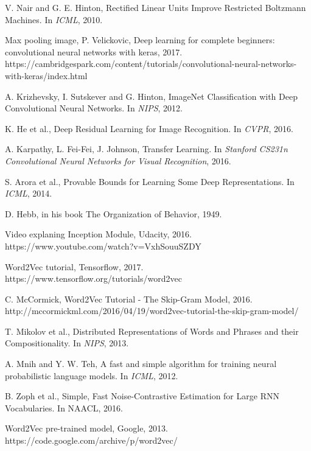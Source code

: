 \begin{thebibliography}{999}
V. Nair and G. E. Hinton, Rectified Linear Units Improve Restricted Boltzmann Machines. In \textit{ICML}, 2010.

Max pooling image, P. Velickovic, 
Deep learning for complete beginners: convolutional neural networks with keras, 2017.\\
https://cambridgespark.com/content/tutorials/convolutional-neural-networks-with-keras/index.html

A. Krizhevsky, I. Sutskever and G. Hinton, ImageNet Classification with Deep Convolutional
Neural Networks. In \textit{NIPS}, 2012.

K. He et al., Deep Residual Learning for Image Recognition. In \textit{CVPR}, 2016.

A. Karpathy, L. Fei-Fei, J. Johnson, Transfer Learning. In \textit{Stanford CS231n Convolutional Neural Networks for Visual Recognition}, 2016.

S. Arora et al., Provable Bounds for Learning Some Deep Representations. In \textit{ICML}, 2014. 

D. Hebb, in his book The Organization of Behavior, 1949.

Video explaning Inception Module, Udacity, 2016. \\ https://www.youtube.com/watch?v=VxhSouuSZDY

Word2Vec tutorial, Tensorflow, 2017. \\
https://www.tensorflow.org/tutorials/word2vec

C. McCormick, Word2Vec Tutorial - The Skip-Gram Model, 2016. \\http://mccormickml.com/2016/04/19/word2vec-tutorial-the-skip-gram-model/

T. Mikolov et al., Distributed Representations of Words and Phrases and their Compositionality. In \textit{NIPS}, 2013.

A. Mnih and Y. W. Teh, A fast and simple algorithm for training neural probabilistic language models. In \textit{ICML}, 2012.

B. Zoph et al., Simple, Fast Noise-Contrastive Estimation for Large RNN Vocabularies. In {NAACL}, 2016.

Word2Vec pre-trained model, Google, 2013. \\https://code.google.com/archive/p/word2vec/


\end{thebibliography}
